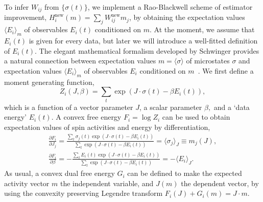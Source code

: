 \documentclass[prx,twocolumn,twoside,showpacs,superscriptaddress]{revtex4-1}
\begin{document}
{\color{blue}To infer $W_{ij}$ from $\{\sigma(t)\}$, we implement a Rao-Blackwell scheme of estimator improvement, $H_i^{\textrm{new}}(m) = \sum_j W^{\textrm{new}}_{ij} m_j$, by obtaining the expectation values $\langle E_i\rangle_m$ of observables $E_i(t)$ conditioned on $m$.
At the moment, we assume that $E_i(t)$ is given for every data, but later we will introduce a well-fitted definition of $E_i(t)$.
The elegant mathematical formalism developed by Schwinger provides a natural connection between expectation values $m=\langle \sigma \rangle$ of microstates $\sigma$ and expectation values $\langle E_i \rangle_m$ of observables $E_i$ conditioned on $m$~\cite{schwinger1953,toms2007schwinger}. 
We first define a moment generating function,
\begin{equation}
\label{eq:Zi}
Z_i(J,\beta)=\sum_{t} \exp( J\cdot \sigma(t) - \beta E_i(t) ),
\end{equation}}
which is a function of a vector parameter $J$, a scalar parameter $\beta,$ and a `data energy' $E_i(t)$. %
A convex free energy $F_i=\log Z_i$ can be used  to obtain expectation values of spin activities {\color{blue}and energy} by differentiation,
\begin{align}
\label{eq:hbeta}
\frac{\partial F_i}{\partial J_j} = \frac{\sum_{t} \sigma_j(t) \exp ( J\cdot \sigma(t) - \beta E_i(t) )}{\sum_{t} \exp (J\cdot \sigma(t) - \beta E_i(t) )} = \langle \sigma_j \rangle_J \equiv m_j(J), \\
\frac{\partial F_i}{\partial \beta} = - \frac{\sum_{t} E_{i}(t) \exp ( J\cdot \sigma(t) - \beta E_i(t) )}{\sum_{t} \exp (J\cdot \sigma(t) - \beta E_i(t) )} = - \langle E_i  \rangle_{J}.
\end{align}
As usual, a convex dual free energy $G_i$ can be defined to make the expected activity vector $m$ the independent variable, and $J(m)$ the dependent vector, by using the convexity preserving Legendre transform $F_i(J)+G_i(m)=J\cdot m.$ 
\end{document}
